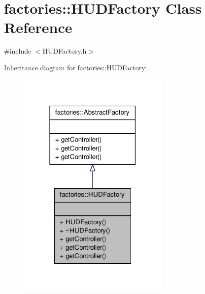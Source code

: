 \hypertarget{classfactories_1_1HUDFactory}{\section{factories\-:\-:\-H\-U\-D\-Factory \-Class \-Reference}
\label{d5/d6e/classfactories_1_1HUDFactory}
}


{\ttfamily \#include $<$\-H\-U\-D\-Factory.\-h$>$}



\-Inheritance diagram for factories\-:\-:\-H\-U\-D\-Factory\-:
\nopagebreak
\begin{figure}[H]
\begin{center}
\leavevmode
\includegraphics[width=210pt]{d0/df4/classfactories_1_1HUDFactory__inherit__graph}
\end{center}
\end{figure}


